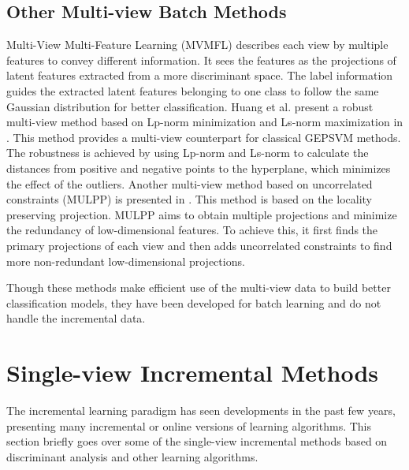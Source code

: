 \subsection{Other Multi-view Batch Methods}
\label{subs:Lit_Mv_Other}
Multi-View Multi-Feature Learning (MVMFL) \cite{LiZLZ19} describes each view by multiple features to convey different information. It sees the features as the projections of latent features extracted from a more discriminant space. The label information guides the extracted latent features belonging to one class to follow the same Gaussian distribution for better classification. Huang et al. present a robust multi-view method based on Lp-norm minimization and Ls-norm maximization in \cite{HuangYLYL19}. This method provides a multi-view counterpart for classical GEPSVM methods. The robustness is achieved by using Lp-norm and Ls-norm to calculate the distances from positive and negative points to the hyperplane, which minimizes the effect of the outliers. Another multi-view method based on uncorrelated constraints (MULPP) is presented in \cite{YinS20}. This method is based on the locality preserving projection. MULPP aims to obtain multiple projections and minimize the redundancy of low-dimensional features. To achieve this, it first finds the primary projections of each view and then adds uncorrelated constraints to find more non-redundant low-dimensional projections.

Though these methods make efficient use of the multi-view data to build better classification models, they have been developed for batch learning and do not handle the incremental data.











\section{Single-view Incremental Methods}
\label{sec:Lit_Inc}
The incremental learning paradigm has seen developments in the past few years, presenting many incremental or online versions of learning algorithms. This section briefly goes over some of the single-view incremental methods based on discriminant analysis and other learning algorithms.

